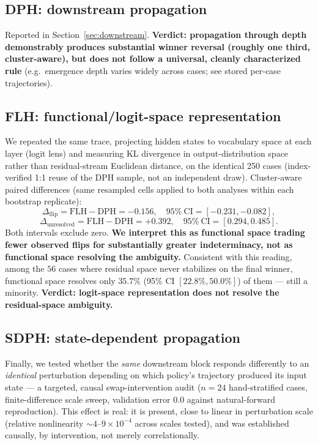 \documentclass[11pt]{article}
\begin{document}
\subsection{DPH: downstream propagation}

Reported in Section~\ref{sec:downstream}. \textbf{Verdict: propagation
through depth demonstrably produces substantial winner reversal (roughly
one third, cluster-aware), but does not follow a universal, cleanly
characterized rule} (e.g.\ emergence depth varies widely across cases; see
stored per-case trajectories).

\subsection{FLH: functional/logit-space representation}

We repeated the same trace, projecting hidden states to vocabulary space at
each layer (logit lens) and measuring KL divergence in output-distribution
space rather than residual-stream Euclidean distance, on the identical 250
cases (index-verified 1:1 reuse of the DPH sample, not an independent draw).
Cluster-aware paired differences (same resampled cells applied to both
analyses within each bootstrap replicate):
\[
\Delta_{\text{flip}} = \text{FLH} - \text{DPH} = -0.156,\quad
95\%\ \text{CI} = [-0.231,-0.082],
\]
\[
\Delta_{\text{unresolved}} = \text{FLH} - \text{DPH} = +0.392,\quad
95\%\ \text{CI} = [0.294, 0.485].
\]
Both intervals exclude zero. \textbf{We interpret this as functional space
trading fewer observed flips for substantially greater indeterminacy, not as
functional space resolving the ambiguity.} Consistent with this reading,
among the $56$ cases where residual space never stabilizes on the final
winner, functional space resolves only $35.7\%$ (95\% CI $[22.8\%,50.0\%]$)
of them --- still a minority. \textbf{Verdict: logit-space representation
does not resolve the residual-space ambiguity.}

\subsection{SDPH: state-dependent propagation}

Finally, we tested whether the \emph{same} downstream block responds
differently to an \emph{identical} perturbation depending on which policy's
trajectory produced its input state --- a targeted, causal swap-intervention
audit ($n=24$ hand-stratified cases, finite-difference scale sweep,
validation error $0.0$ against natural-forward reproduction). This effect is
real: it is present, close to linear in perturbation scale (relative
nonlinearity $\sim\!4$--$9\times10^{-4}$ across scales tested), and was
established causally, by intervention, not merely correlationally.
\end{document}
